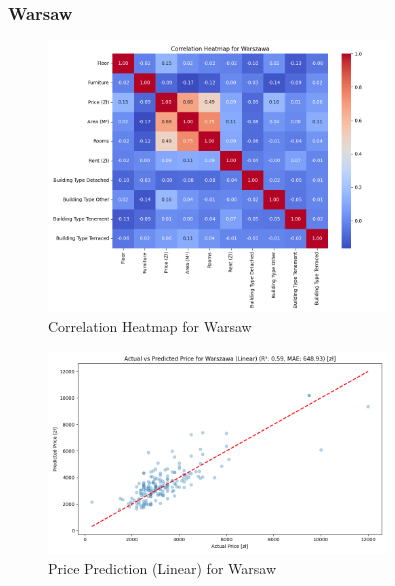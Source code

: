 \subsubsection{Warsaw}
\begin{figure}[H]
    \centering
    \includegraphics[width=0.8\textwidth]{figures/warsaw_correlation_heatmap.png}
    \caption{Correlation Heatmap for Warsaw}
\end{figure}
\begin{figure}[H]
    \centering
    \includegraphics[width=0.8\textwidth]{figures/warsaw_price_prediction_linear.png}
    \caption{Price Prediction (Linear) for Warsaw}
\end{figure}

